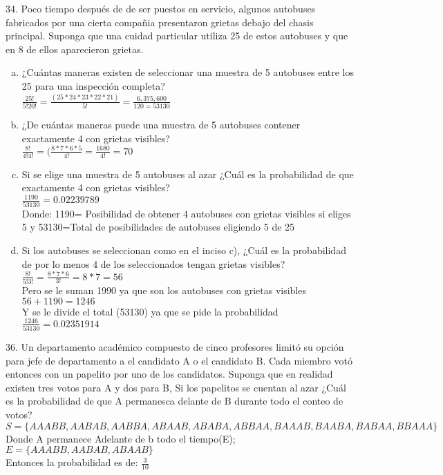 \documentclass[12pt, letterpaper, spanish]{article}
\begin{document}
	34. Poco tiempo después de de ser puestos en servicio, algunos autobuses fabricados por una cierta compañia presentaron grietas debajo del chasis principal. Suponga que una cuidad particular utiliza 25 de estos autobuses y que en 8 de ellos aparecieron grietas.\\
	\begin{enumerate}[a)]
		\item ¿Cuántas maneras existen de seleccionar una muestra de 5 autobuses entre los 25 para una inspección completa?\\
		$\frac{25!}{5!20!}=\frac{(25*24*23*22*21)}{5!}=\frac{6,375,600}{120=53130}$
		\item ¿De cuántas maneras puede una muestra de 5 autobuses contener exactamente 4 con grietas visibles? \\
		$\frac{8!}{4!4!}=(\frac{8*7*6*5}{4!}=\frac{1680}{4!}=70$
		\item Si se elige una muestra de 5 autobuses al azar ¿Cuál es la probabilidad de que exactamente 4 con grietas visibles?\\
		$\frac{1190}{53130}=0.02239789$
		\\Donde: 1190= Posibilidad de obtener 4 autobuses con grietas visibles si eliges 5 y  53130=Total de posibilidades de autobuses eligiendo 5 de 25

		\item Si los autobuses se seleccionan como en el inciso c), ¿Cuál es la probabilidad de por lo menos 4 de los seleccionados tengan grietas visibles?\\
		$\frac{8!}{5!3!}=\frac{8*7*6}{3!}=8*7=56$\\
		Pero se le suman 1990 ya que son los autobuses con grietas visibles\\
		$56+1190=1246$\\
		Y se le divide el total (53130) ya que se pide la probabilidad\\
		$\frac{1246}{53130}=0.02351914$
	\end{enumerate}
	36. Un departamento académico compuesto de cinco profesores limitó su opción para jefe de departamento a el candidato A o el candidato B. Cada miembro votó entonces con un papelito por uno de los candidatos. Suponga que en realidad existen tres votos para A y dos para B, Si los papelitos se cuentan al azar ¿Cuál es la probabilidad de que A permanesca delante de B durante todo el conteo de votos? \\
	$S= \lbrace AAABB, AABAB, AABBA, ABAAB, ABABA, ABBAA, BAAAB, BAABA, BABAA, BBAAA\rbrace$\\
Donde A permanece Adelante de b todo el tiempo(E);\\
$E=\lbrace AAABB,AABAB,ABAAB \rbrace$\\
Entonces la probabilidad es de: $\frac{3}{10}$\\
\end{document}
